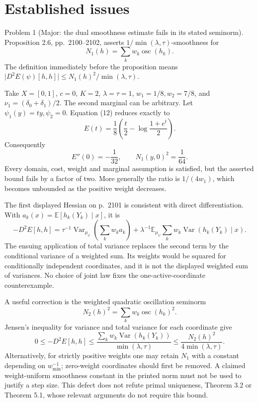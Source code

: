 \documentclass[10pt]{article}
\begin{document}
\section*{Established issues}
Problem 1 (Major: the dual smoothness estimate fails in its stated seminorm).  Proposition 2.6, pp. 2100–2102, asserts \(1/\min(\lambda,\tau)\)-smoothness for \[N_1(h)=\sum_k w_k\operatorname{osc}(h_k).\] The definition immediately before the proposition means \(\lvert D^2E(\psi)[h,h]\rvert\le
N_1(h)^2/\min(\lambda,\tau)\).\par
Take \(X=[0,1]\), \(c=0\), \(K=2\), \(\lambda=\tau=1\), \(w_1=1/8,w_2=7/8\), and \(\nu_1=(\delta_0+\delta_1)/2\). The second marginal can be arbitrary. Let \(\psi_1(y)=ty,\psi_2=0\). Equation (12) reduces exactly to \[E(t)=\frac18\left(\frac t2-\log\frac{1+e^t}{2}\right).\] Consequently \[E''(0)=-\frac1{32},\qquad
 N_1(y,0)^2=\frac1{64}.\] Every domain, cost, weight and marginal assumption is satisfied, but the asserted bound fails by a factor of two. More generally the ratio is \(1/(4w_1)\), which becomes unbounded as the positive weight decreases.\par
The first displayed Hessian on p. 2101 is consistent with direct differentiation. With \(a_k(x)=\mathbb E[h_k(Y_k)\mid x]\), it is \[-D^2E[h,h]
 =\tau^{-1}\mathop{\mathrm{Var}}_{\mu_\psi}\!\left(\sum_k w_ka_k\right)
 +\lambda^{-1}\mathbb E_{\mu_\psi}
                       \sum_k w_k\mathop{\mathrm{Var}}(h_k(Y_k)\mid x).\] The ensuing application of total variance replaces the second term by the conditional variance of a weighted sum. Its weights would be squared for conditionally independent coordinates, and it is not the displayed weighted sum of variances. No choice of joint law fixes the one-active-coordinate counterexample.\par
A useful correction is the weighted quadratic oscillation seminorm \[N_2(h)^2=\sum_k w_k\operatorname{osc}(h_k)^2.\] Jensen’s inequality for variance and total variance for each coordinate give \[0\le-D^2E[h,h]\le
 \frac{\sum_k w_k\mathop{\mathrm{Var}}(h_k(Y_k))}{\min(\lambda,\tau)}
 \le\frac{N_2(h)^2}{4\min(\lambda,\tau)}.\] Alternatively, for strictly positive weights one may retain \(N_1\) with a constant depending on \(w_{\min}^{-1}\); zero-weight coordinates should first be removed. A claimed weight-uniform smoothness constant in the printed norm must not be used to justify a step size. This defect does not refute primal uniqueness, Theorem 3.2 or Theorem 5.1, whose relevant arguments do not require this bound.\par
\end{document}
